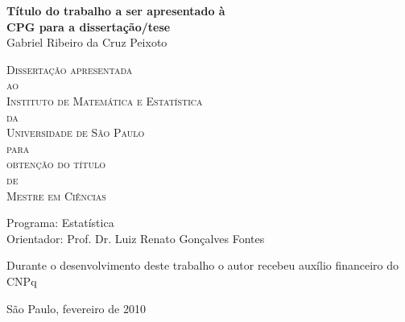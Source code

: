 \documentclass[11pt,twoside,a4paper]{book}
\begin{document}
\frontmatter 
\fancyhead[RO]{{\footnotesize\rightmark}\hspace{2em}\thepage}
\setcounter{tocdepth}{2}
\fancyhead[LE]{\thepage\hspace{2em}\footnotesize{\leftmark}}
\fancyhead[RE,LO]{}
\fancyhead[RO]{{\footnotesize\rightmark}\hspace{2em}\thepage}

\onehalfspacing  %

\thispagestyle{empty}
\begin{center}
  \vspace*{2.3cm}
  \textbf{\Large{Título do trabalho a ser apresentado à \\
      CPG para a dissertação/tese}}\\
  
  \vspace*{1.2cm}
  \Large{Gabriel Ribeiro da Cruz Peixoto}
  
  \vskip 2cm
  \textsc{
    Dissertação apresentada\\[-0.25cm] 
    ao\\[-0.25cm]
    Instituto de Matemática e Estatística\\[-0.25cm]
    da\\[-0.25cm]
    Universidade de São Paulo\\[-0.25cm]
    para\\[-0.25cm]
    obtenção do título\\[-0.25cm]
    de\\[-0.25cm]
    Mestre em Ciências}
  
  \vskip 1.5cm
  Programa: Estatística\\
  Orientador: Prof. Dr. Luiz Renato Gonçalves Fontes

  \vskip 1cm
  \normalsize{Durante o desenvolvimento deste trabalho o autor recebeu auxílio
    financeiro do CNPq}
  
  \vskip 0.5cm
  \normalsize{São Paulo, fevereiro de 2010}
\end{center}

\end{document}
